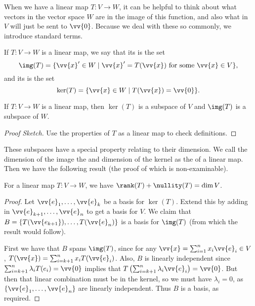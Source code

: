When we have a linear map $T: V \rightarrow W$, it can be helpful to think about what vectors in the vector space $W$ are in the image of this function, and also what in $V$ will just be sent to $\vv{0}$. Because we deal with these so commonly, we introduce standard terms.

\begin{definition}
    If $T: V \rightarrow W$ is a linear map, we say that its  is the set
    $$
    \img(T) = \{ \vv{x}' \in W \mid \vv{x}' = T(\vv{x}) \text{ for some } \vv{x} \in V\},
    $$ 
    and its  is the set
    $$
    \ker (T) = \{ \vv{x} \in W \mid T(\vv{x}) = \vv{0}\}.
    $$
\end{definition}

\begin{proposition}
    If $T : V \rightarrow W$ is a linear map, then $\ker(T)$ is a subspace of $V$ and $\img(T)$ is a subspace of $W$.
\end{proposition}
\begin{proof}[Proof Sketch]
    Use the properties of $T$ as a linear map to check definitions.
\end{proof}

These subspaces have a special property relating to their dimension.
We call the dimension of the image the  and dimension of the kernel as the  of a linear map. Then we have the following result (the proof of which is non-examinable).

\begin{theorem}
    For a linear map $T: V \rightarrow W$, we have $\rank(T) + \nullity(T) = \dim V$.
\end{theorem}
\begin{proof}
    Let $\vv{e}_1, \dots, \vv{e}_k$ be a basis for $\ker (T)$. Extend this by adding in $\vv{e}_{k + 1}, \dots, \vv{e}_n$ to get a basis for $V$. We claim that $B = \{T(\vv{e_{k + 1}}), \dots, T(\vv{e}_n)\}$ is a basis for $\img (T)$ (from which the result would follow).

    First we have that $B$ spans $\img(T)$, since for any $\vv{x} = \sum_{i =1}^n x_i \vv{e}_i \in V$, $T(\vv{x}) = \sum_{i = k+1}^n x_i T(\vv{e}_i)$. Also, $B$ is linearly independent since $\sum_{i = k + 1}^n \lambda_i T(e_i) = \vv{0}$ implies that $T\left(\sum_{i = k + 1}^n \lambda_i \vv{e}_i\right) = \vv{0}$. But then that linear combination must be in the kernel, so we must have $\lambda_i = 0$, as $\{\vv{e}_1, \dots, \vv{e}_n\}$ are linearly independent. Thus $B$ is a basis, as required.
\end{proof}
